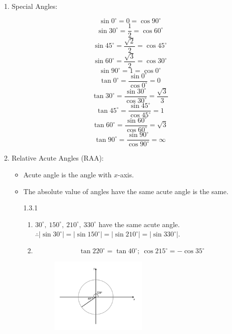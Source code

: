 \documentclass[12pt, a4paper]{article}
\begin{document}
\begin{enumerate}
\begin{itemize}
\begin{figure}[H]
    \end{figure}
  \end{itemize}
  \item Special Angles: 
  \begin{multicols}{2}
    $$\sin0^\circ=0=\cos90^\circ$$
    $$\sin30^\circ=\frac{1}{2}=\cos60^\circ$$
    $$\sin45^\circ=\frac{\sqrt{2}}{2}=\cos45^\circ$$
    $$\sin60^\circ=\frac{\sqrt{3}}{2}=\cos30^\circ$$
    $$\sin90^\circ=1=\cos0^\circ$$
    $$\tan0^\circ=\frac{\sin0^\circ}{\cos0^\circ}=0$$
    $$\tan30^\circ=\frac{\sin30^\circ}{\cos30^\circ}=\frac{\sqrt{3}}{3}$$
    $$\tan45^\circ=\frac{\sin45^\circ}{\cos45^\circ}=1$$
    $$\tan60^\circ=\frac{\sin60^\circ}{\cos60^\circ}=\sqrt{3}$$
    $$\tan90^\circ=\frac{\sin90^\circ}{\cos90^\circ}=\infty$$
  \end{multicols}
  \item Relative Acute Angles (RAA): 
  \begin{itemize}
    \item Acute angle is the angle with $x$-axis.
    \item The absolute value of angles have the same acute angle is the same. 
    \begin{example}{1.3.1}{}
      \begin{enumerate}
        \item $30^\circ,\ 150^\circ,\ 210^\circ,\ 330^\circ$ have the same acute angle. \\
        $\therefore \left|\sin30^\circ\right|=\left|\sin150^\circ\right|=\left|\sin210^\circ\right|=\left|\sin330^\circ\right|.$
        \item $$\tan220^\circ=\tan40^\circ;\ \cos215^\circ=-\cos35^\circ$$
        \begin{figure}[H]
          \centering
          \includegraphics[width=0.5\textwidth]{Fig.24.jpg}
        \end{figure}
      \end{enumerate}
    \end{example}
  \end{itemize}
\end{enumerate}
\end{document}
